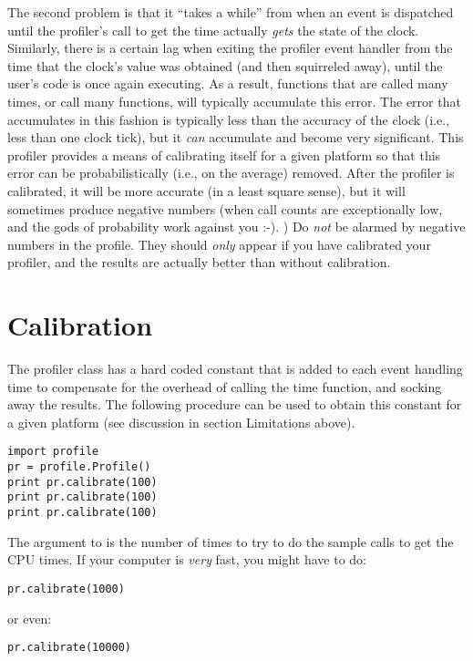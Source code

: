 The second problem is that it ``takes a while'' from when an event is
dispatched until the profiler's call to get the time actually
\emph{gets} the state of the clock.  Similarly, there is a certain lag
when exiting the profiler event handler from the time that the clock's
value was obtained (and then squirreled away), until the user's code
is once again executing.  As a result, functions that are called many
times, or call many functions, will typically accumulate this error.
The error that accumulates in this fashion is typically less than the
accuracy of the clock (i.e., less than one clock tick), but it
\emph{can} accumulate and become very significant.  This profiler
provides a means of calibrating itself for a given platform so that
this error can be probabilistically (i.e., on the average) removed.
After the profiler is calibrated, it will be more accurate (in a least
square sense), but it will sometimes produce negative numbers (when
call counts are exceptionally low, and the gods of probability work
against you :-). )  Do \emph{not} be alarmed by negative numbers in
the profile.  They should \emph{only} appear if you have calibrated
your profiler, and the results are actually better than without
calibration.


\section{Calibration \label{profile-calibration}}

The profiler class has a hard coded constant that is added to each
event handling time to compensate for the overhead of calling the time
function, and socking away the results.  The following procedure can
be used to obtain this constant for a given platform (see discussion
in section Limitations above).

\begin{verbatim}
import profile
pr = profile.Profile()
print pr.calibrate(100)
print pr.calibrate(100)
print pr.calibrate(100)
\end{verbatim}

The argument to  is the number of times to try to
do the sample calls to get the CPU times.  If your computer is
\emph{very} fast, you might have to do:

\begin{verbatim}
pr.calibrate(1000)
\end{verbatim}

or even:

\begin{verbatim}
pr.calibrate(10000)
\end{verbatim}

